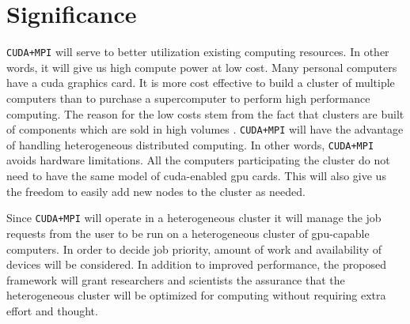 \section{Significance}

\texttt{CUDA+MPI} will serve to better utilization existing computing
resources. In other words, it will give us high compute power at low cost. Many
personal computers have a \gls{cuda} graphics card. It is more cost effective
to build a cluster of multiple computers than to purchase a supercomputer to
perform high performance computing. The reason for the low costs stem from the
fact that clusters are built of components which are sold in high volumes
\cite{erdt2008automatic}. \texttt{CUDA+MPI} will have the advantage of handling
heterogeneous distributed computing. In other words, \texttt{CUDA+MPI} avoids
hardware limitations. All the computers participating the cluster do not need
to have the same model of \gls{cuda}-enabled \gls{gpu} cards. This will also
give us the freedom to easily add new nodes to the cluster as needed.

Since \texttt{CUDA+MPI} will operate in a heterogeneous cluster it will manage
the job requests from the user to be run on a heterogeneous cluster of
\gls{gpu}-capable computers. In order to decide job priority, amount of work
and availability of devices will be considered. In addition to improved
performance, the proposed framework will grant researchers and scientists the
assurance that the heterogeneous cluster will be optimized for computing
without requiring extra effort and thought.
